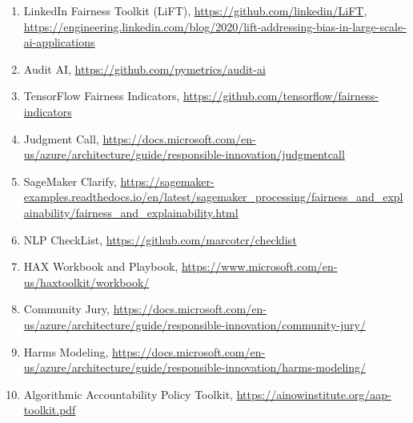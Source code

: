 \documentclass[acmsmall]{acmart}
\begin{document}
\begin{enumerate}[label=T\arabic*]
    \item \label{itm:T18-LiFT} LinkedIn Fairness Toolkit (LiFT), 	\url{https://github.com/linkedin/LiFT}, \url{https://engineering.linkedin.com/blog/2020/lift-addressing-bias-in-large-scale-ai-applications}
    \item \label{itm:T19-AuditAI}	Audit AI, \url{https://github.com/pymetrics/audit-ai}
    \item \label{itm:T20-TensorFlow} TensorFlow Fairness Indicators,	\url{https://github.com/tensorflow/fairness-indicators}
    \item \label{itm:T21-JudgmentCall} Judgment Call,	\url{https://docs.microsoft.com/en-us/azure/architecture/guide/responsible-innovation/judgmentcall}
    \item \label{itm:T22-SageMaker} SageMaker Clarify, \url{https://sagemaker-examples.readthedocs.io/en/latest/sagemaker_processing/fairness_and_explainability/fairness_and_explainability.html}
    \item \label{itm:T23-NLPChecklist}	NLP CheckList, 	\url{https://github.com/marcotcr/checklist}
    \item \label{T24-HAX} HAX Workbook and Playbook, 	\url{https://www.microsoft.com/en-us/haxtoolkit/workbook/}
    \item \label{itm:T27-CommunityJury}	Community Jury, \url{https://docs.microsoft.com/en-us/azure/architecture/guide/responsible-innovation/community-jury/}
    \item \label{itm:T28-HarmsModeling}	Harms Modeling,	\url{https://docs.microsoft.com/en-us/azure/architecture/guide/responsible-innovation/harms-modeling/}
    \item \label{itm:T29-AlgorithmicAccountabilityPolicy}	Algorithmic Accountability Policy Toolkit,	\url{https://ainowinstitute.org/aap-toolkit.pdf}

\end{enumerate}


\end{document}
